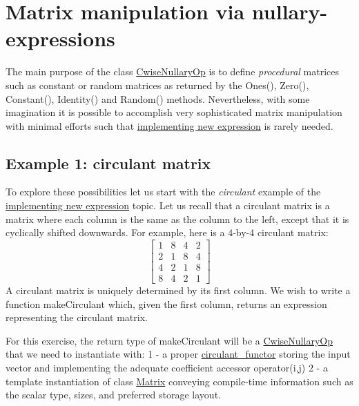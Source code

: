  \hypertarget{TopicCustomizing_NullaryExpr}{}\section{Matrix manipulation via nullary-\/expressions}\label{TopicCustomizing_NullaryExpr}
The main purpose of the class \hyperlink{group___core___module_class_eigen_1_1_cwise_nullary_op}{Cwise\+Nullary\+Op} is to define {\itshape procedural} matrices such as constant or random matrices as returned by the Ones(), Zero(), Constant(), Identity() and Random() methods. Nevertheless, with some imagination it is possible to accomplish very sophisticated matrix manipulation with minimal efforts such that \hyperlink{TopicNewExpressionType}{implementing new expression} is rarely needed.\hypertarget{_topic_customizing__nullary_expr_NullaryExpr_Circulant}{}\subsection{Example 1\+: circulant matrix}\label{_topic_customizing__nullary_expr_NullaryExpr_Circulant}
To explore these possibilities let us start with the {\itshape circulant} example of the \hyperlink{TopicNewExpressionType}{implementing new expression} topic. Let us recall that a circulant matrix is a matrix where each column is the same as the column to the left, except that it is cyclically shifted downwards. For example, here is a 4-\/by-\/4 circulant matrix\+: \[ \begin{bmatrix} 1 & 8 & 4 & 2 \\ 2 & 1 & 8 & 4 \\ 4 & 2 & 1 & 8 \\ 8 & 4 & 2 & 1 \end{bmatrix} \] A circulant matrix is uniquely determined by its first column. We wish to write a function {\ttfamily make\+Circulant} which, given the first column, returns an expression representing the circulant matrix.

For this exercise, the return type of {\ttfamily make\+Circulant} will be a \hyperlink{group___core___module_class_eigen_1_1_cwise_nullary_op}{Cwise\+Nullary\+Op} that we need to instantiate with\+: 1 -\/ a proper {\ttfamily \hyperlink{classcirculant__functor}{circulant\+\_\+functor}} storing the input vector and implementing the adequate coefficient accessor {\ttfamily operator(i,j)} 2 -\/ a template instantiation of class \hyperlink{group___core___module_class_eigen_1_1_matrix}{Matrix} conveying compile-\/time information such as the scalar type, sizes, and preferred storage layout.


